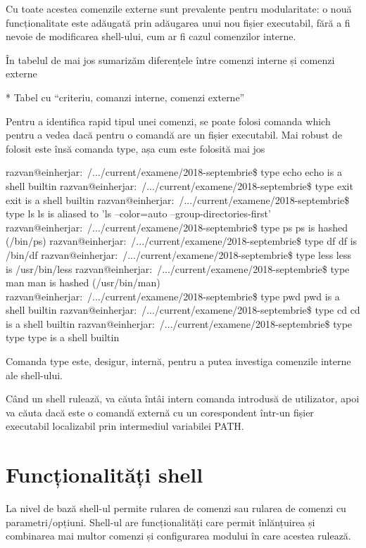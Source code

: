 Cu toate acestea comenzile externe sunt prevalente pentru modularitate: o nouă
funcționalitate este adăugată prin adăugarea unui nou fișier executabil, fără a
fi nevoie de modificarea shell-ului, cum ar fi cazul comenzilor interne.

În tabelul de mai jos sumarizăm diferențele între comenzi interne și comenzi
externe

* Tabel cu “criteriu, comanzi interne, comenzi externe”

Pentru a identifica rapid tipul unei comenzi, se poate folosi comanda which
pentru a vedea dacă pentru o comandă are un fișier executabil. Mai robust de
folosit este însă comanda type, așa cum este folosită mai jos

\begin{screen}
razvan@einherjar:~/.../current/examene/2018-septembrie\$ type echo
echo is a shell builtin
razvan@einherjar:~/.../current/examene/2018-septembrie\$ type exit
exit is a shell builtin
razvan@einherjar:~/.../current/examene/2018-septembrie\$ type ls
ls is aliased to 'ls --color=auto --group-directories-first'
razvan@einherjar:~/.../current/examene/2018-septembrie\$ type ps
ps is hashed (/bin/ps)
razvan@einherjar:~/.../current/examene/2018-septembrie\$ type df
df is /bin/df
razvan@einherjar:~/.../current/examene/2018-septembrie\$ type less
less is /usr/bin/less
razvan@einherjar:~/.../current/examene/2018-septembrie\$ type man
man is hashed (/usr/bin/man)
razvan@einherjar:~/.../current/examene/2018-septembrie\$ type pwd
pwd is a shell builtin
razvan@einherjar:~/.../current/examene/2018-septembrie\$ type cd
cd is a shell builtin
razvan@einherjar:~/.../current/examene/2018-septembrie\$ type type
type is a shell builtin
\end{screen}

Comanda type este, desigur, internă, pentru a putea investiga comenzile interne
ale shell-ului.

Când un shell rulează, va căuta întâi intern comanda introdusă de utilizator,
apoi va căuta dacă este o comandă externă cu un corespondent într-un fișier
executabil localizabil prin intermediul variabilei PATH.

\section{Funcționalități shell}
\label{sec:cli-shell-func}

La nivel de bază shell-ul permite rularea de comenzi sau rularea de comenzi cu
parametri/opțiuni. Shell-ul are funcționalități care permit înlănțuirea și
combinarea mai multor comenzi și configurarea modului în care acestea rulează.

